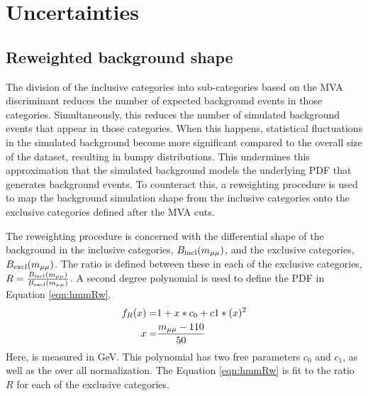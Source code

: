 \section{Uncertainties}\label{sec:hmmSyst}

\subsection{Reweighted background shape}\label{sec:hmmRw}

The division of the inclusive categories into sub-categories based on the MVA discriminant reduces the number of expected background events in those categories.
Simultaneously, this reduces the number of simulated background events that appear in those categories.
When this happens, statistical fluctuations in the simulated background become more significant compared to the overall size of the dataset, resulting in bumpy \muu distributions.
This undermines this approximation that the simulated background models the underlying PDF that generates background events.
To counteract this, a reweighting procedure is used to map the background simulation shape from the inclusive categories onto the exclusive categories defined after the MVA cuts.

The reweighting procedure is concerned with the differential \muu shape of the background in the inclusive categories, $B_\text{incl}(m_{\mu\mu})$, and the exclusive categories, $B_\text{excl}(m_{\mu\mu})$.
The ratio is defined between these in each of the exclusive categories, $R=\frac{B_\text{incl}(m_{\mu\mu})}{B_\text{excl}(m_{\mu\mu})}$.
A second degree polynomial is used to define the PDF in Equation \ref{eqn:hmmRw}.
\begin{equation}\begin{split} \label{eqn:hmmRw}
f_R(x)=&1+x*c_0+c 1*(x)^2 \\
x=&\frac{m_{\mu\mu}-110}{50} \\
\end{split}\end{equation} 
Here, \muu is measured in GeV.
This polynomial has two free parameters $c_0$ and $c_1$, as well as the over all normalization.
The Equation \ref{eqn:hmmRw} is fit to the ratio $R$ for each of the exclusive categories.

